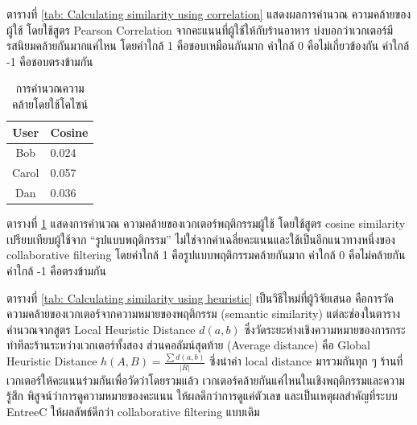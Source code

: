 ตารางที่ \ref{tab: Calculating similarity using correlation} แสดงผลการคำนวณ ความคล้ายของผู้ใช้ โดยใช้สูตร Pearson Correlation จากคะแนนที่ผู้ใช้ให้กับร้านอาหาร บ่งบอกว่าเวกเตอร์มีรสนิยมคล้ายกันมากแค่ไหน โดยค่าใกล้ 1 คือชอบเหมือนกันมาก ค่าใกล้ 0 คือไม่เกี่ยวข้องกัน ค่าใกล้ -1 คือชอบตรงข้ามกัน 

\begin{table}[H]
\centering
\caption{การคำนวณความคล้ายโดยใช้โคไซน์ \cite{hybrid_nd}}
\label{tab: Calculating similarity using cosine}
\begin{tabular}{|c|l|}
\hline
\textbf{User} & \textbf{Cosine} \\
\hline
Bob & 0.024  \\ \hline
Carol & 0.057  \\ \hline
Dan & 0.036  \\ \hline
\end{tabular}
\end{table}

ตารางที่ \ref{tab: Calculating similarity using cosine} แสดงการคำนวณ ความคล้ายของเวกเตอร์พฤติกรรมผู้ใช้ โดยใช้สูตร cosine similarity เปรียบเทียบผู้ใช้จาก “รูปแบบพฤติกรรม” ไม่ใช่จากค่าเฉลี่ยคะแนนและใช้เป็นอีกแนวทางหนึ่งของ collaborative filtering โดยค่าใกล้ 1 คือรูปแบบพฤติกรรมคล้ายกันมาก ค่าใกล้ 0 คือไม่คล้ายกัน ค่าใกล้ -1 คือตรงข้ามกัน 

\begin{table}[H]
\centering
\caption{ระยะห่างเชิง Heuristic แบบเฉพาะที่และแบบภาพรวม \cite{hybrid_nd}}
\label{tab: Calculating similarity using heuristic}
\end{table}

ตารางที่ \ref{tab: Calculating similarity using heuristic} เป็นวิธีใหม่ที่ผู้วิจัยเสนอ คือการวัดความคล้ายของเวกเตอร์จากความหมายของพฤติกรรม (semantic similarity) แต่ละช่องในตารางคำนวณจากสูตร Local Heuristic Distance $d(a,b)$ ซึ่งวัดระยะห่างเชิงความหมายของการกระทำทีละร้านระหว่างเวกเตอร์ทั้งสอง ส่วนคอลัมน์สุดท้าย (Average distance) คือ Global Heuristic Distance $h(A,B) = \frac{\sum d(a,b)}{|R|}$ ซึ่งนำค่า local distance มารวมกันทุก ๆ ร้านที่เวกเตอร์ให้คะแนนร่วมกันเพื่อวัดว่าโดยรวมแล้ว เวกเตอร์คล้ายกันแค่ไหนในเชิงพฤติกรรมและความรู้สึก พิสูจน์ว่าการดูความหมายของคะแนน ให้ผลดีกว่าการดูแค่ตัวเลข และเป็นเหตุผลสำคัญที่ระบบ EntreeC ให้ผลลัพธ์ดีกว่า collaborative filtering แบบเดิม 

